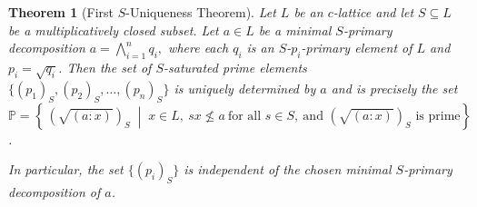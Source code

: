 \documentclass[10pt,twoside,a4]{amsart}
\numberwithin{equation}{section}
\theoremstyle{plain}
\newtheorem{thm}[lem]{Theorem}
\theoremstyle{definition}
\begin{document}
\begin{thm}[First $S$-Uniqueness Theorem]
	Let $L$ be an $c$-lattice and let $S \subseteq L$ be a multiplicatively closed subset.  Let $a \in L$ be a minimal $S$-primary decomposition $ a=\bigwedge_{i=1}^{n} q_i,$
	where each $q_i$ is an \linebreak $S$-$p_i$-primary element of $L$ and $p_i = \sqrt{q_i}$. Then the set of $S$-saturated prime elements \linebreak $\{ (p_1)_S, (p_2)_S, \dots, (p_n)_S \}$ is uniquely determined by $a$ and is precisely the set \linebreak $	\mathbb{P} = \left\{\, (\sqrt{(a:x)})_S \;\middle|\; x \in L,\ sx \nleq a \ \text{for all } s \in S,\ \text{and } (\sqrt{(a:x)})_S \text{ is prime} \right\}$.
	
	In particular, the set $\{ (p_i)_S \}$ is independent of the chosen minimal $S$-primary decomposition of $a$.
\end{thm}
\end{document}
